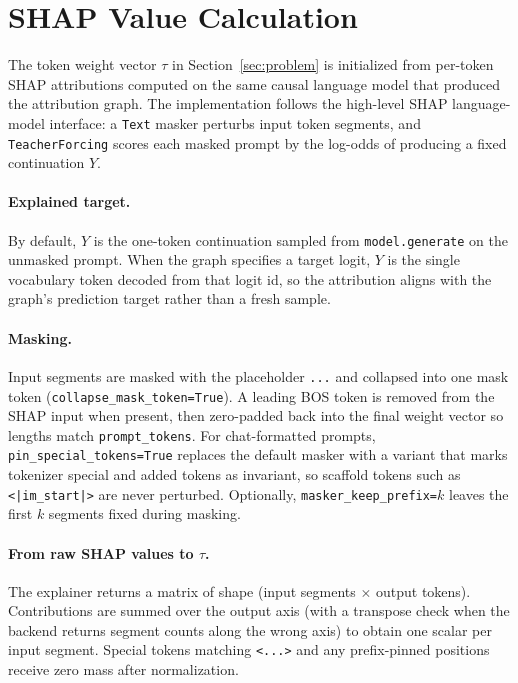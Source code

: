 \documentclass[../main.tex]{subfiles}
\begin{document}
\section{SHAP Value Calculation}
\label{app:shap}

The token weight vector $\tau$ in Section~\ref{sec:problem} is initialized from
per-token SHAP attributions computed on the same causal language model that produced
the attribution graph. The implementation follows the high-level SHAP language-model
interface: a \texttt{Text} masker perturbs input token segments, and
\texttt{TeacherForcing} scores each masked prompt by the log-odds of producing a
fixed continuation $Y$.

\paragraph{Explained target.}
By default, $Y$ is the one-token continuation sampled from
\texttt{model.generate} on the unmasked prompt.
When the graph specifies a target logit, $Y$ is the single vocabulary token
decoded from that logit id, so the attribution aligns with the graph's prediction
target rather than a fresh sample.

\paragraph{Masking.}
Input segments are masked with the placeholder \texttt{...} and collapsed into one
mask token (\texttt{collapse\_mask\_token=True}). A leading BOS token is removed
from the SHAP input when present, then zero-padded back into the final weight
vector so lengths match \texttt{prompt\_tokens}. For chat-formatted prompts,
\texttt{pin\_special\_tokens=True} replaces the default masker with a variant that
marks tokenizer special and added tokens as invariant, so scaffold tokens such as
\texttt{<|im\_start|>} are never perturbed. Optionally,
\texttt{masker\_keep\_prefix=$k$} leaves the first $k$ segments fixed during masking.

\paragraph{From raw SHAP values to $\tau$.}
The explainer returns a matrix of shape (input segments $\times$ output tokens).
Contributions are summed over the output axis (with a transpose check when the
backend returns segment counts along the wrong axis) to obtain one scalar per input
segment. Special tokens matching \texttt{<...>} and any prefix-pinned positions
receive zero mass after normalization.
\end{document}
